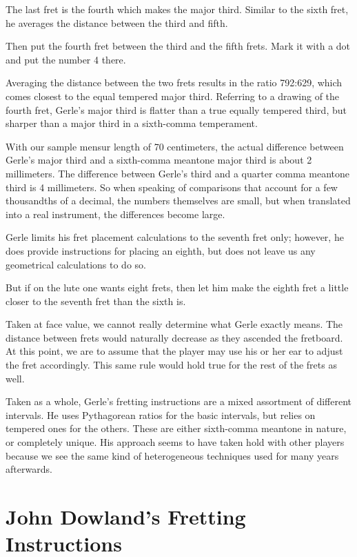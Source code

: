 The last fret is the fourth which makes the major third. Similar to the sixth fret, he
averages the distance between the third and fifth.
\begin{blocks}
Then put the fourth fret between the third and the fifth frets. Mark it with a
dot and put the number 4 there.
\end{blocks}
Averaging the distance between the two frets results in the ratio 792:629, which comes
closest to the equal tempered major third. Referring to a drawing of the fourth fret,
Gerle's major third is flatter than a true equally tempered third, but sharper than a
major third in a sixth-comma temperament.

With our sample mensur length of 70 centimeters, the actual difference
between Gerle's major third and a sixth-comma meantone major third is about 2
millimeters. The difference between Gerle's third and a quarter comma meantone third
is 4 millimeters. So when speaking of comparisons that account for a few thousandths of
a decimal, the numbers themselves are small, but when translated into a real
instrument, the differences become large.

Gerle limits his fret placement calculations to the seventh fret only; however,
he does provide instructions for placing an eighth, but does not leave us any
geometrical calculations to do so.
\begin{blocks}
But if on the lute one wants eight frets, then let him make the eighth fret a
little closer to the seventh fret than the sixth is.
\end{blocks}
Taken at face value, we cannot really determine what Gerle exactly means. The
distance between frets would naturally decrease as they ascended the fretboard.
At this point, we are to assume that the player may use his or her ear to adjust
the fret accordingly. This same rule would hold true for the rest of the frets
as well.

Taken as a whole, Gerle's fretting instructions are a mixed assortment of different
intervals. He uses Pythagorean ratios for the basic intervals, but relies on tempered
ones for the others. These are either sixth-comma meantone in nature, or completely
unique. His approach seems to have taken hold with other players because we see the
same kind of heterogeneous techniques used for many years afterwards.

%
%
\section{John Dowland's Fretting Instructions}

